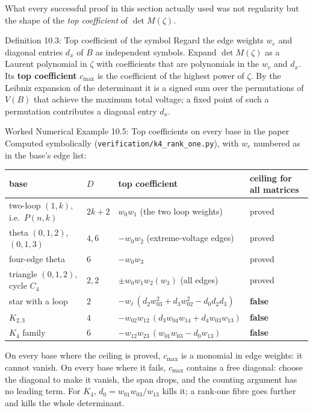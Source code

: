 \documentclass[11pt]{article}
\begin{document}
What every successful proof in this section actually used was not regularity but the shape of the \emph{top coefficient} of $\det M(\zeta)$.

\begin{defbox}{Definition 10.3: Top coefficient of the symbol}
Regard the edge weights $w_e$ and diagonal entries $d_x$ of $B$ as independent symbols. Expand $\det M(\zeta)$ as a Laurent polynomial in $\zeta$ with coefficients that are polynomials in the $w_e$ and $d_x$. Its \textbf{top coefficient} $c_{\max}$ is the coefficient of the highest power of $\zeta$. By the Leibniz expansion of the determinant it is a signed sum over the permutations of $V(B)$ that achieve the maximum total voltage; a fixed point of such a permutation contributes a diagonal entry $d_x$.
\end{defbox}

\begin{callbox}{Worked Numerical Example 10.5: Top coefficients on every base in the paper}
Computed symbolically (\texttt{verification/k4\_rank\_one.py}), with $w_e$ numbered as in the base's edge list:
\begin{center}
\small
\begin{tabular}{llll}
\toprule
base & $D$ & top coefficient & ceiling for all matrices \\
\midrule
two-loop $(1,k)$, i.e.\ $P(n,k)$ & $2k+2$ & $w_0w_1$ (the two loop weights) & proved \\
theta $(0,1,2)$, $(0,1,3)$ & $4,6$ & $-w_0w_2$ (extreme-voltage edges) & proved \\
four-edge theta & $6$ & $-w_0w_3$ & proved \\
triangle $(0,1,2)$, cycle $C_4$ & $2,2$ & $\pm w_0w_1w_2(w_3)$ (all edges) & proved \\
\midrule
star with a loop & $2$ & $-w_\ell\,(d_2w_{03}^2+d_3w_{02}^2-d_0d_2d_3)$ & \textbf{false} \\
$K_{2,3}$ & $4$ & $-w_{02}w_{12}\,(d_3w_{04}w_{14}+d_4w_{03}w_{13})$ & \textbf{false} \\
$K_4$ family & $6$ & $-w_{12}w_{23}\,(w_{01}w_{03}-d_0w_{13})$ & \textbf{false} \\
\bottomrule
\end{tabular}
\end{center}
On every base where the ceiling is proved, $c_{\max}$ is a monomial in edge weights: it cannot vanish. On every base where it fails, $c_{\max}$ contains a free diagonal: choose the diagonal to make it vanish, the span drops, and the counting argument has no leading term. For $K_4$, $d_0=w_{01}w_{03}/w_{13}$ kills it; a rank-one fibre goes further and kills the whole determinant.
\end{callbox}
\end{document}

